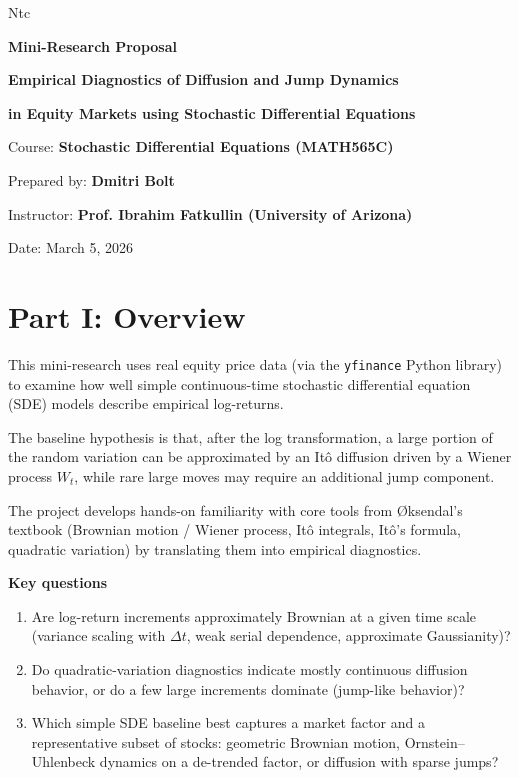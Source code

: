 Ntc\documentclass[11pt]{article}
\begin{document}
	
	\begin{center}
		
		{\Large\bfseries Mini-Research Proposal}
		
		\vspace{0.2cm}
		
		{\large\bfseries Empirical Diagnostics of Diffusion and Jump Dynamics}
		
		{\large\bfseries in Equity Markets using Stochastic Differential Equations}
		
		\vspace{0.4cm}
		
		Course: \textbf{Stochastic Differential Equations (MATH565C)}
		
		
		Prepared by: \textbf{Dmitri Bolt}
		
		Instructor: \textbf{Prof. Ibrahim Fatkullin (University of Arizona)}
		
		Date: March 5, 2026
		
	\end{center}
	
	\vspace{0.3cm}
	
	\section*{Part I: Overview}
	
	This mini-research uses real equity price data (via the \texttt{yfinance} Python library) to examine how well simple continuous-time stochastic differential equation (SDE) models describe empirical log-returns.
	
	The baseline hypothesis is that, after the log transformation, a large portion of the random variation can be approximated by an Itô diffusion driven by a Wiener process \(W_t\), while rare large moves may require an additional jump component.
	
	The project develops hands-on familiarity with core tools from Øksendal’s textbook (Brownian motion / Wiener process, Itô integrals, Itô’s formula, quadratic variation) by translating them into empirical diagnostics.
	
	\textbf{Key questions}
	
	\begin{enumerate}
		\item Are log-return increments approximately Brownian at a given time scale (variance scaling with \(\Delta t\), weak serial dependence, approximate Gaussianity)?
		\item Do quadratic-variation diagnostics indicate mostly continuous diffusion behavior, or do a few large increments dominate (jump-like behavior)?
		\item Which simple SDE baseline best captures a market factor and a representative subset of stocks: geometric Brownian motion, Ornstein–Uhlenbeck dynamics on a de-trended factor, or diffusion with sparse jumps?
	\end{enumerate}
	
\end{document}
